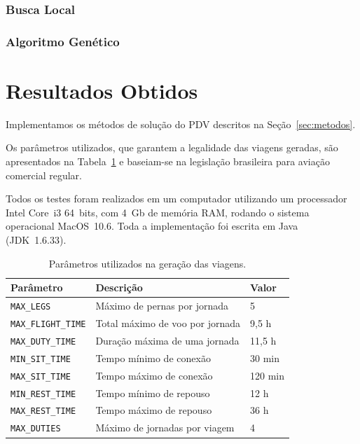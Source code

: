 \documentclass[12pt,a4paper]{article}
\newcommand{\zerar}{\setcounter{equation}{0}\setcounter{figure}{0}\setcounter{table}{0}}
\begin{document}

\subsubsection{Busca Local}
\label{sec:metodos_busca}


\subsubsection{Algoritmo Genético}
\label{sec:metodos_genetico}


\zerar
\section{Resultados Obtidos}
\label{sec:resultados}

Implementamos os métodos de solução do PDV descritos na Seção~\ref{sec:metodos}.

Os parâmetros utilizados, que garantem a legalidade das viagens geradas, são apresentados na 
Tabela~\ref{tab:parametros} e baseiam-se na legislação brasileira para aviação comercial regular. 

Todos os testes foram realizados em um computador utilizando um processador Intel Core~i3 64~bits, 
com 4~Gb de memória RAM, rodando o sistema operacional MacOS~10.6. Toda a implementação foi escrita 
em Java (JDK~1.6.33).

\begin{table}
	\begin{center}
		\begin{tabular}{|l|l|l|}
			\hline 
			\bf Parâmetro & \bf Descrição & \bf Valor \\
			\hline \hline 
			\verb|MAX_LEGS| & Máximo de pernas por jornada & 5 \\ \hline
			\verb|MAX_FLIGHT_TIME| & Total máximo de voo por jornada & 9,5 h \\ \hline
			\verb|MAX_DUTY_TIME| & Duração máxima de uma jornada & 11,5 h \\ \hline
			\verb|MIN_SIT_TIME| & Tempo mínimo de conexão & 30 min \\ \hline
			\verb|MAX_SIT_TIME| & Tempo máximo de conexão & 120 min \\ \hline
			\verb|MIN_REST_TIME| & Tempo mínimo de repouso & 12 h \\ \hline
			\verb|MAX_REST_TIME| & Tempo máximo de repouso & 36 h \\ \hline
			\verb|MAX_DUTIES| & Máximo de jornadas por viagem & 4 \\ \hline
			\end{tabular} 
			\caption{Parâmetros utilizados na geração das viagens.}
			\label{tab:parametros}
	\end{center}
\end{table}
\end{document}
